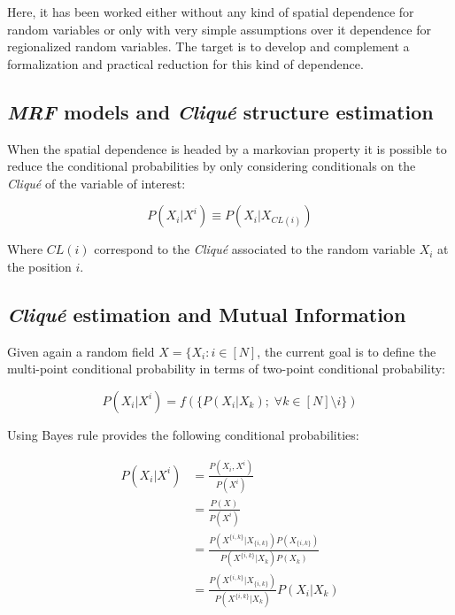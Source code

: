 Here, it has been worked either without any kind of spatial dependence for random variables or only with very simple assumptions over it dependence for regionalized random variables. The target is to develop and complement a formalization and practical reduction for this kind of dependence.

\subsection{\emph{MRF} models and \emph{Cliqué} structure estimation}

When the spatial dependence is headed by a markovian property it is possible to reduce the conditional probabilities by only considering conditionals on the \emph{Cliqué} of the variable of interest:

\begin{equation}\label{eq:eq_markov_PROPERTY}
	P(X_{ i } | X^{ i }) \equiv P(X_{ i } | X_{CL(i)})
\end{equation}
 
Where $CL(i)$ correspond to the \emph{Cliqué} associated to the random variable $X_{ i }$ at the position $i$.

\subsection{\emph{Cliqué} estimation and Mutual Information}

\label{sec_MI_Clique}

Given again a random field $X = \{X_{ i } : i \in [N]$, the current goal is to define the multi-point conditional probability in terms of two-point conditional probability:

\begin{equation}\label{eq_def_prob_mps}
P(X_{ i }| X^{ i }) = f(\{P(X_{ i }|X_{ k }); \; \forall k \in [N] \setminus{i}\} ) 
\end{equation}

Using Bayes rule provides the following conditional probabilities:

\begin{align}\label{eq_bayes_prob_mps}
	P(X_{ i } |X^{ i }) &= \frac{P(X_{ i }, X^{ i })}{P(X^{ i })} \nonumber\\
				&=\frac{P(X)}{P(X^{ i })} \nonumber\\
				&=\frac{P(X^{ \{i,k\} }|X_{ \{i,k\} })P(X_{ \{i,k\} })}{P(X^{ \{i,k\} }|X_{ k })P(X_{ k })}\nonumber\\
				&=\frac{P(X^{ \{i,k\} }|X_{ \{i,k\} })}{P(X^{ \{i,k\} }|X_{ k })}P(X_{ i }|X_{ k })
\end{align}


